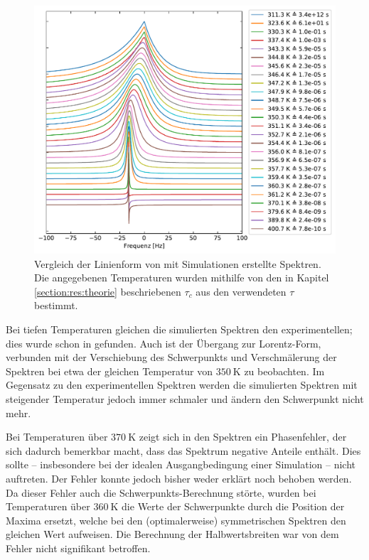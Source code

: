 \begin{figure}
	\begin{center}
		\includegraphics[width=\textwidth]{graphics/plot/sim_lineshape.pdf}
	\end{center}
	\caption{Vergleich der Linienform von mit Simulationen erstellte Spektren. Die angegebenen Temperaturen wurden mithilfe von den in Kapitel \ref{section:res:theorie} beschriebenen $\tau_c$ aus den verwendeten $\tau$ bestimmt.} \label{fig:res:sim_linienform}
\end{figure}

Bei tiefen Temperaturen gleichen die simulierten Spektren den experimentellen; dies wurde schon in \cite{joachim_master} gefunden. Auch ist der Übergang zur Lorentz-Form, verbunden mit der Verschiebung des Schwerpunkts und Verschmälerung der Spektren bei etwa der gleichen Temperatur von $\SI{350}{\kelvin}$ zu beobachten. Im Gegensatz zu den experimentellen Spektren werden die simulierten Spektren mit steigender Temperatur jedoch immer schmaler und ändern den Schwerpunkt nicht mehr.

Bei Temperaturen über $\SI{370}{\kelvin}$ zeigt sich in den Spektren ein Phasenfehler, der sich dadurch bemerkbar macht, dass das Spektrum negative Anteile enthält. Dies sollte -- insbesondere bei der idealen Ausgangbedingung einer Simulation -- nicht auftreten. Der Fehler konnte jedoch bisher weder erklärt noch behoben werden. Da dieser Fehler auch die Schwerpunkts-Berechnung störte, wurden bei Temperaturen über $\SI{360}{\kelvin}$ die Werte der Schwerpunkte durch die Position der Maxima ersetzt, welche bei den (optimalerweise) symmetrischen Spektren den gleichen Wert aufweisen. Die Berechnung der Halbwertsbreiten war von dem Fehler nicht signifikant betroffen.


